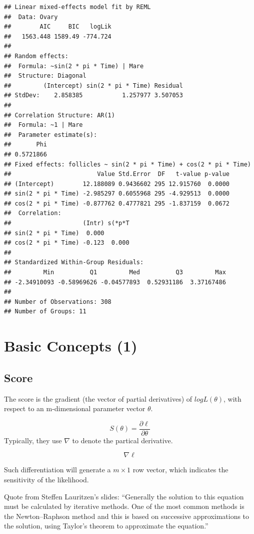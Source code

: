 \documentclass[]{book}
\begin{document}
\begin{verbatim}
## Linear mixed-effects model fit by REML
##  Data: Ovary 
##        AIC     BIC   logLik
##   1563.448 1589.49 -774.724
## 
## Random effects:
##  Formula: ~sin(2 * pi * Time) | Mare
##  Structure: Diagonal
##         (Intercept) sin(2 * pi * Time) Residual
## StdDev:    2.858385           1.257977 3.507053
## 
## Correlation Structure: AR(1)
##  Formula: ~1 | Mare 
##  Parameter estimate(s):
##       Phi 
## 0.5721866 
## Fixed effects: follicles ~ sin(2 * pi * Time) + cos(2 * pi * Time) 
##                        Value Std.Error  DF   t-value p-value
## (Intercept)        12.188089 0.9436602 295 12.915760  0.0000
## sin(2 * pi * Time) -2.985297 0.6055968 295 -4.929513  0.0000
## cos(2 * pi * Time) -0.877762 0.4777821 295 -1.837159  0.0672
##  Correlation: 
##                    (Intr) s(*p*T
## sin(2 * pi * Time)  0.000       
## cos(2 * pi * Time) -0.123  0.000
## 
## Standardized Within-Group Residuals:
##         Min          Q1         Med          Q3         Max 
## -2.34910093 -0.58969626 -0.04577893  0.52931186  3.37167486 
## 
## Number of Observations: 308
## Number of Groups: 11
\end{verbatim}

\chapter{Basic Concepts (1)}\label{basic-concepts-1}

\section{Score}\label{score}

The score is the gradient (the vector of partial derivatives) of
\(log L(\theta)\), with respect to an m-dimensional parameter vector
\(\theta\).

\[S(\theta) = \frac{\partial\ell}{\partial \theta}\] Typically, they use
\(\nabla\) to denote the partical derivative.

\[\nabla \ell\]

Such differentiation will generate a \(m \times 1\) row vector, which
indicates the sensitivity of the likelihood.

Quote from Steffen Lauritzen's slides: ``Generally the solution to this
equation must be calculated by iterative methods. One of the most common
methods is the Newton--Raphson method and this is based on successive
approximations to the solution, using Taylor's theorem to approximate
the equation.''
\end{document}
